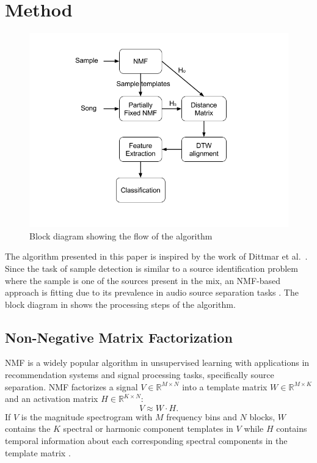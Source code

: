 \documentclass{article}
\begin{document}
\section{Method}
\label{algo}

\begin{figure}[!ht]
\centering
\includegraphics[width=\linewidth]{block_diagram.png}
\caption{Block diagram showing the flow of the algorithm}
\label{fig_block}
\end{figure}

The algorithm presented in this paper is inspired by the work of Dittmar et al.~\cite{dittmar2012audio}. Since the task of sample detection is similar to a source identification problem where the sample is one of the sources present in the mix, an NMF-based approach is fitting due to its prevalence in audio source separation tasks \cite{schmidt2006nonnegative, ozerov2010multichannel}. The block diagram in  shows the processing steps of the algorithm.

\subsection{Non-Negative Matrix Factorization}
NMF is a widely popular algorithm in unsupervised learning with applications in recommendation systems\cite{ma2008sorec,koren2009matrix,luo2014efficient} and signal processing tasks, specifically source separation\cite{lee1999learning,smaragdis2014static,virtanen2007monaural}. NMF factorizes a signal $V \in \mathbb{R}^{M\times N}$ into a template matrix $W \in \mathbb{R}^{M\times K}$ and an activation matrix $H \in \mathbb{R}^{K\times N}$:
\[ V \approx W\cdot H.\]
If $V$ is the magnitude spectrogram with $M$ frequency bins and $N$ blocks, $W$ contains the $K$ spectral or harmonic component templates in $V$ while $H$ contains temporal information about each corresponding spectral components in the template matrix \cite{smaragdis2003non}.
\end{document}
